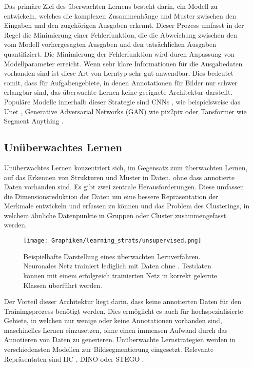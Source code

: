 Das primäre Ziel des überwachten Lernens besteht darin, ein Modell zu entwickeln, welches die komplexen Zusammenhänge und Muster zwischen den Eingaben und den zugehörigen Ausgaben erkennt. Dieser Prozess umfasst in der Regel die Minimierung einer Fehlerfunktion, die die Abweichung zwischen den vom Modell vorhergesagten Ausgaben und den tatsächlichen Ausgaben quantifiziert. Die Minimierung der Fehlerfunktion wird durch Anpassung von Modellparameter erreicht.  
Wenn sehr klare Informationen für die Ausgabedaten vorhanden sind ist diese Art von Lerntyp sehr gut anwendbar. Dies bedeutet somit, dass für Aufgabengebiete, in denen Annotationen für Bilder nur schwer erlangbar sind, das überwachte Lernen keine geeignete Architektur darstellt.\\
Populäre Modelle innerhalb dieser Strategie sind CNNs \cite{CNNsCunHBB99}, wie beispielsweise das Unet \cite{UNETRonneberger2015}, Generative Adversarial Networks (GAN) \cite{GAN_GoodfelowNIPS2014_5ca3e9b1} wie pix2pix \cite{GANisola2018imagetoimage} oder Tansformer\cite{Transformer_Vaswani2017} wie Segment Anything \cite{SAMKirillov2023}.


\subsection{Unüberwachtes Lernen}
\label{sec:unsupervised}
Unüberwachtes Lernen konzentriert sich, im Gegensatz zum überwachten Lernen, auf das Erkennen von Strukturen und Muster in Daten, ohne dass annotierte Daten vorhanden sind. Es gibt zwei zentrale Herausforderungen. Diese umfassen die Dimensionsreduktion der Daten um eine bessere Repräsentation der Merkmale entwickeln und erfassen zu können und das Problem des Clusterings, in welchem ähnliche Datenpunkte in Gruppen oder Cluster zusammengefasst werden. \\
\begin{figure}[h!]
    \centering
    \texttt{[image: Graphiken/learning\_strats/unsupervised.png]}
    \caption{Beispielhafte Darstellung eines überwachten Lernverfahren. Neuronales Netz trainiert lediglich mit Daten ohne . Testdaten können mit einem erfolgreich trainierten Netz in korrekt gelernte Klassen überführt werden.}
    \label{fig:unsupervised}
\end{figure}

Der Vorteil dieser Architektur liegt darin, dass keine annotierten Daten für den Trainingsprozess benötigt werden. Dies ermöglicht es auch für hochspezialisierte Gebiete, in welchen nur wenige oder keine Annotationen vorhanden sind, maschinelles Lernen einzusetzen, ohne einen immensen Aufwand durch das Annotieren von Daten zu generieren.
Unüberwachte Lernstrategien werden in verschiedensten Modellen zur Bildsegmentierung eingesetzt. Relevante Repräsentaten sind IIC \cite{iicji2019}, DINO \cite{caron2021emerging} oder STEGO \cite{STEGOhamilton2022unsupervised}.   

